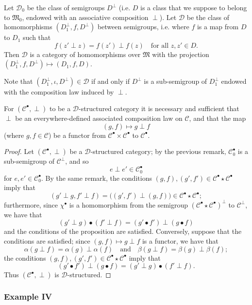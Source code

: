\documentclass[a4paper,fleqn]{article}
\theoremstyle{plain}
\newenvironment{proposition}[1]
  {\renewcommand\theinnerproposition{#1}\innerproposition}
  {\endinnerproposition}
\theoremstyle{definition}
\newcommand{\textand}{\quad\text{and}\quad}
\newcommand{\CC}{\mathcal{C}}
\newcommand{\MM}{\mathfrak{M}}
\newcommand{\DD}{\mathcal{D}}
\begin{document}
Let $\DD_0$ be the class of semigroups $D^\perp$ (i.e. $D$ is a class that we suppose to belong to $\MM_0$, endowed with an associative composition $\perp$).
Let $\DD$ be the class of homomorphisms $(D_1^\perp,f,D^\perp)$ between semigroups, i.e. where $f$ is a map from $D$ to $D_1$ such that
\[
  f(z'\perp z)
  = f(z')\perp f(z)
  \quad\text{for all $z,z'\in D$.}
\]
Then $\DD$ is a category of homomorphisms over $\MM$ with the projection $(D_1^\perp,f,D^\perp)\mapsto(D_1,f,D)$.

Note that $(D_1^\perp,\iota,D^\perp)\in\DD$ if and only if $D^\perp$ is a sub-semigroup of $D_1^\perp$ endowed with the composition law induced by $\perp$.

\begin{proposition}{7}
\label{proposition:ii-7}
  For $(\CC^\bullet,\perp)$ to be a $\DD$-structured category it is necessary and sufficient that $\perp$ be an everywhere-defined associated composition law on $\CC$, and that the map
  \[
    (g,f)
    \longmapsto g\perp f
  \]
  (where $g,f\in\CC$) be a functor from $\CC^\bullet\times\CC^\bullet$ to $\CC^\bullet$.
\end{proposition}

\begin{proof}
  Let $(\CC^\bullet,\perp)$ be a $\DD$-structured category;
  by the previous remark, $\CC_0^\bullet$ is a sub-semigroup of $\CC^\perp$, and so
  \[
    e\perp e'
    \in\CC_0^\bullet
  \]
  for $e,e'\in\CC_0^\bullet$.
  By the same remark, the conditions $(g,f),(g',f')\in\CC^\bullet\star\CC^\bullet$ imply that
  \[
    (g'\perp g,f'\perp f)
    = \big(
      (g',f')\perp(g,f)
    \big)
    \in\CC^\bullet\star\CC^\bullet;
  \]
  furthermore, since $\chi^\bullet$ is a homomorphism from the semigroup $(\CC^\bullet\star\CC^\bullet)^\perp$ to $\CC^\perp$, we have that
  \[
    (g'\perp g)\bullet(f'\perp f)
    = (g'\bullet f')\perp(g\bullet f)
  \]
  and the conditions of the proposition are satisfied.
  Conversely, suppose that the conditions are satisfied;
  since $(g,f)\mapsto g\perp f$ is a functor, we have that
  \[
    \alpha(g\perp f)
    =\alpha(g)\perp\alpha(f)
    \textand
    \beta(g\perp f)
    =\beta(g)\perp\beta(f);
  \]
  the conditions $(g,f),(g',f')\in\CC^\bullet\star\CC^\bullet$ imply that
  \[
    (g'\bullet f')\perp(g\bullet f)
    = (g'\perp g)\bullet(f'\perp f).
  \]
  Thus $(\CC^\bullet,\perp)$ is $\DD$-structured.
\end{proof}


\subsubsection*{Example IV}
\label{section:ii-3-iv}
\end{document}
